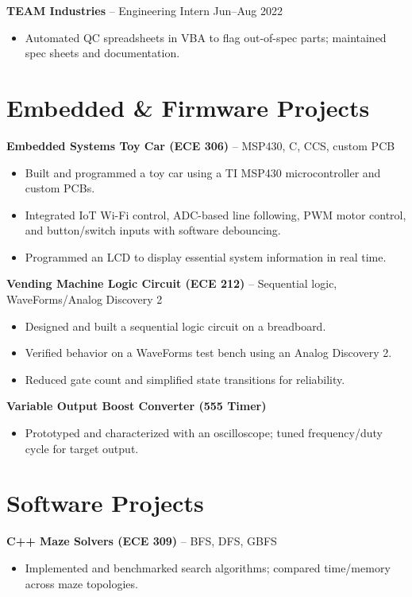 \documentclass[10pt,letterpaper]{article}
\begin{document}
\textbf{TEAM Industries} -- Engineering Intern \hfill Jun--Aug 2022
\begin{itemize}
  \item Automated QC spreadsheets in VBA to flag out-of-spec parts; maintained spec sheets and documentation.
\end{itemize}

\section*{Embedded \& Firmware Projects}
\textbf{Embedded Systems Toy Car (ECE 306)} -- MSP430, C, CCS, custom PCB
\begin{itemize}
  \item Built and programmed a toy car using a TI MSP430 microcontroller and custom PCBs.
  \item Integrated IoT Wi-Fi control, ADC-based line following, PWM motor control, and button/switch inputs with software debouncing.
  \item Programmed an LCD to display essential system information in real time.
\end{itemize}


\textbf{Vending Machine Logic Circuit (ECE 212)} -- Sequential logic, WaveForms/Analog Discovery 2
\begin{itemize}
  \item Designed and built a sequential logic circuit on a breadboard.
  \item Verified behavior on a WaveForms test bench using an Analog Discovery 2.
  \item Reduced gate count and simplified state transitions for reliability.
\end{itemize}

\textbf{Variable Output Boost Converter (555 Timer)}
\begin{itemize}
  \item Prototyped and characterized with an oscilloscope; tuned frequency/duty cycle for target output.
\end{itemize}

\section*{Software Projects}
\textbf{C++ Maze Solvers (ECE 309)} -- BFS, DFS, GBFS
\begin{itemize}
  \item Implemented and benchmarked search algorithms; compared time/memory across maze topologies.
\end{itemize}
\end{document}
